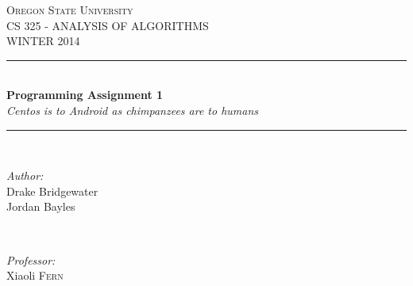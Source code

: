 \documentclass[letterpaper,10pt]{article}
\def\name{Drake Bridgewater \\ Jordan Bayles}
\def\title{Programming Assignment 1}
\def\subject{CS }
\def\courseNumber{ 325 }
\def\courseName{ANALYSIS OF ALGORITHMS}
\def\courseInfo{WINTER 2014 }%
\def\supervisor{Xiaoli \textsc{Fern}} %
\begin{document}
\begin{titlepage}

\newcommand{\HRule}{\rule{\linewidth}{0.5mm}} %

\center %
 

\textsc{\LARGE Oregon State University}\\[1.5cm] %
\textsc{\Large \subject \courseNumber - \courseName}\\[0.5cm] %
\textsc{\large \courseInfo}\\[0.5cm] %


\HRule \\[0.4cm]
{ \huge \bfseries \title }\\[0.4cm] %
{\small \textit{Centos is to Android as chimpanzees are to humans}}\\[0.4cm]
\HRule \\[1.5cm]
 

\begin{minipage}{0.4\textwidth}
\begin{flushleft} \large
\emph{Author:}\\
\name
\end{flushleft}
\end{minipage}
~
\begin{minipage}{0.4\textwidth}
\begin{flushright} \large
\emph{Professor:} \\
\supervisor
\end{flushright}
\end{minipage}\\[4cm]



\end{titlepage}
\end{document}
